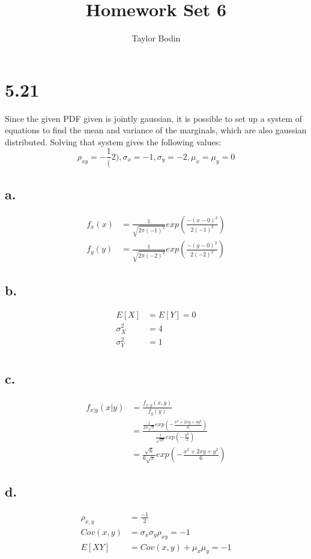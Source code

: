 \documentclass[12pt]{article}
\newcommand{\normD}[3]{\frac{1}{\sqrt{2\pi #1^2}}exp\left(\frac{-( #2 - #3)^2}{2 #1^2}\right)}
\begin{document}
\title{Homework Set 6}
\author{Taylor Bodin}
\maketitle

\section{5.21}
Since the given PDF given is jointly gaussian, it is possible to set up a system of equations to find
the mean and variance of the marginals, which are also gaussian distributed. Solving that system gives
the following values:
\[\rho_{xy} = -\frac{1}(2), \sigma_x = -1, \sigma_y = -2, \mu_x = \mu_y = 0\]

\subsection{a.}
\begin{align*}
  f_x(x) &= \normD{(-1)}{x}{0} \\
  f_y(y) &= \normD{(-2)}{y}{0}
\end{align*}

\subsection{b.}
\begin{align*}
  E[X] &= E[Y] = 0 \\
  \sigma_X^2 &= 4 \\ 
  \sigma_Y^2 &= 1 \\ 
\end{align*}

\subsection{c.}
\begin{align*}
  f_{x|y}(x|y) &= \frac{f_{x,y}(x,y)}{f_y(y)} \\
  &= \frac{\frac{1}{2\pi\sqrt{3}}exp\left( -\frac{x^2 + 2xy + 4y^2}{6} \right)}
    {\frac{1}{\sqrt{2\pi}}exp\left( -\frac{y^2}{2} \right)} \\
    &= \frac{\sqrt{6}}{6\sqrt{\pi}}exp\left( -\frac{x^2 + 2xy + y^2}{6} \right)
\end{align*}

\subsection{d.}
\begin{align*}
  \rho_{x,y} &= \frac{-1}{2} \\
  Cov(x,y) &= \sigma_x \sigma_y \rho_{xy} = -1 \\
  E[XY] &= Cov(x,y) + \mu_x \mu_y = -1
\end{align*}
\end{document}
